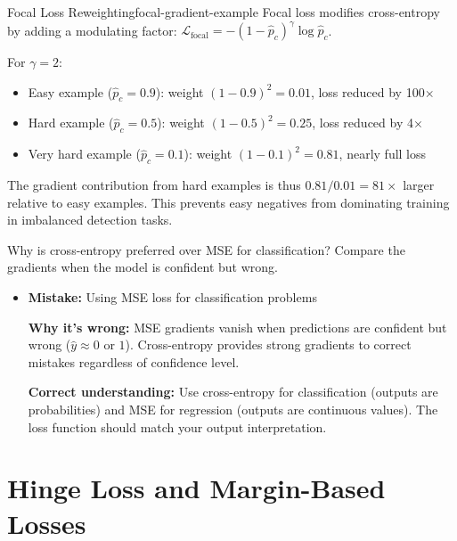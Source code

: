 \documentclass[../../main.tex]{subfiles}
\begin{document}
\begin{example}{Focal Loss Reweighting}{focal-gradient-example}
Focal loss modifies cross-entropy by adding a modulating factor: $\mathcal{L}_{\text{focal}} = -(1-\hat{p}_c)^\gamma \log \hat{p}_c$.

For $\gamma = 2$:
\begin{itemize}
    \item Easy example ($\hat{p}_c = 0.9$): weight $(1-0.9)^2 = 0.01$, loss reduced by 100$\times$
    \item Hard example ($\hat{p}_c = 0.5$): weight $(1-0.5)^2 = 0.25$, loss reduced by 4$\times$
    \item Very hard example ($\hat{p}_c = 0.1$): weight $(1-0.1)^2 = 0.81$, nearly full loss
\end{itemize}
The gradient contribution from hard examples is thus $0.81/0.01 = 81\times$ larger relative to easy examples. This prevents easy negatives from dominating training in imbalanced detection tasks.
\end{example}

\begin{checkpoint}
Why is cross-entropy preferred over MSE for classification? Compare the gradients when the model is confident but wrong.
\end{checkpoint}

\begin{commonmistakes}
\begin{itemize}
    \item \textbf{Mistake:} Using MSE loss for classification problems

    \textbf{Why it's wrong:} MSE gradients vanish when predictions are confident but wrong ($\hat{y} \approx 0$ or $1$). Cross-entropy provides strong gradients to correct mistakes regardless of confidence level.

    \textbf{Correct understanding:} Use cross-entropy for classification (outputs are probabilities) and MSE for regression (outputs are continuous values). The loss function should match your output interpretation.
\end{itemize}
\end{commonmistakes}

\section{Hinge Loss and Margin-Based Losses}
\label{sec:hinge-loss}
\end{document}
